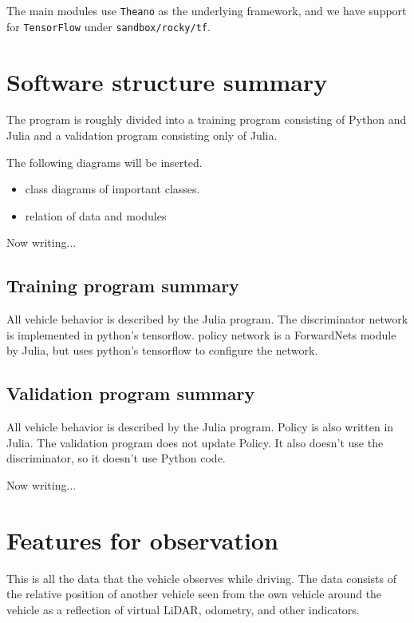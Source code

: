 The main modules use {\tt Theano} as the underlying framework, and we have support for {\tt TensorFlow} under {\tt sandbox/rocky/tf}.


\section{Software structure summary}

The program is roughly divided into a training program consisting of Python and Julia and a validation program consisting only of Julia.

The following diagrams will be inserted.
\begin{itemize}
\item class diagrams of important classes.
\item relation of data and modules
\end{itemize}




Now writing...


\subsection{Training program summary}

All vehicle behavior is described by the Julia program. The discriminator network is implemented in python's tensorflow.
policy network is a ForwardNets module by Julia, but uses python's tensorflow to configure the network.



\subsection{Validation program summary}

All vehicle behavior is described by the Julia program. 
Policy is also written in Julia.
The validation program does not update Policy. It also doesn't use the discriminator, so it doesn't use Python code.

Now writing...


\section{Features for observation}

This is all the data that the vehicle observes while driving. The data consists of the relative position of another vehicle seen from the own vehicle around the vehicle as a reflection of virtual LiDAR, odometry, and other indicators.

